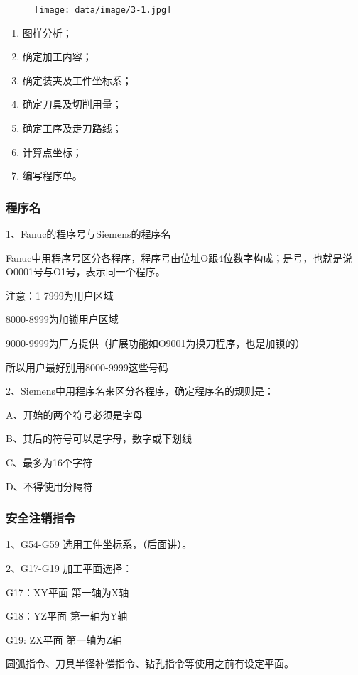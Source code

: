 \begin{figure}
    \centering
    \texttt{[image: data/image/3-1.jpg]}
    \caption{}
    \label{fig:3-1}
\end{figure}

\begin{enumerate}[1、]
    \item 图样分析；
    \item 确定加工内容；
    \item 确定装夹及工件坐标系；
    \item 确定刀具及切削用量；
    \item 确定工序及走刀路线；
    \item 计算点坐标；
    \item 编写程序单。
\end{enumerate}

\subsubsection{程序名}
1、Fanuc的程序号与Siemens的程序名

Fanuc中用程序号区分各程序，程序号由位址O跟4位数字构成；是号，也就是说O0001号与O1号，表示同一个程序。

注意：1-7999为用户区域

8000-8999为加锁用户区域

9000-9999为厂方提供（扩展功能如O9001为换刀程序，也是加锁的）

所以用户最好别用8000-9999这些号码

2、Siemens中用程序名来区分各程序，确定程序名的规则是：

A、开始的两个符号必须是字母

B、其后的符号可以是字母，数字或下划线

C、最多为16个字符

D、不得使用分隔符

\subsubsection{安全注销指令}
1、G54-G59  选用工件坐标系，（后面讲）。

2、G17-G19  加工平面选择：

G17：XY平面 第一轴为X轴

G18：YZ平面 第一轴为Y轴

G19: ZX平面 第一轴为Z轴

圆弧指令、刀具半径补偿指令、钻孔指令等使用之前有设定平面。

